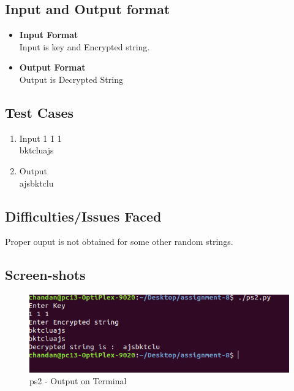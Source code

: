 \documentclass[a4paper,12pt]{article}
\begin{document}
	\subsection{Input and Output format}
	\begin{itemize}
		\item \textbf{Input Format}\\
		Input is key and Encrypted string.
		\item \textbf{Output Format}\\
		Output is Decrypted String
	\end{itemize}
	\subsection{Test Cases}
	\begin{enumerate}
		\item Input
		1 1 1\\
		bktcluajs\\
		\item Output \\
		ajsbktclu
		
	\end{enumerate}
	
	\subsection{Difficulties/Issues Faced}
	Proper ouput is not obtained for some other random strings.
	
	\newpage
	\subsection{Screen-shots}
	
	
	\begin{figure}[h]
	\includegraphics[scale=0.8]{ps2.png}
	\caption{ps2 - Output on Terminal}
	\label{fig:ps2}
	\end{figure}

	
\end{document}
